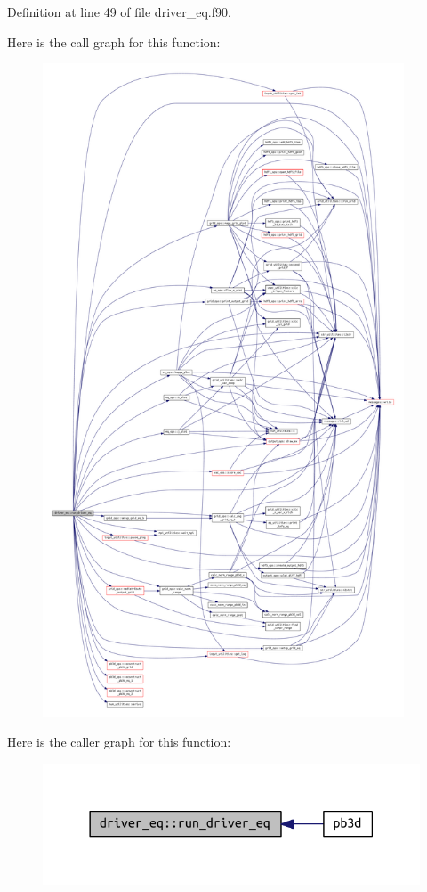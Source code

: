Definition at line 49 of file driver\+\_\+eq.\+f90.

Here is the call graph for this function\+:\nopagebreak
\begin{figure}[H]
\begin{center}
\leavevmode
\includegraphics[height=550pt]{namespacedriver__eq_adc9d5dff288fa512e5ef885627d940cc_cgraph}
\end{center}
\end{figure}
Here is the caller graph for this function\+:\nopagebreak
\begin{figure}[H]
\begin{center}
\leavevmode
\includegraphics[width=318pt]{namespacedriver__eq_adc9d5dff288fa512e5ef885627d940cc_icgraph}
\end{center}
\end{figure}
